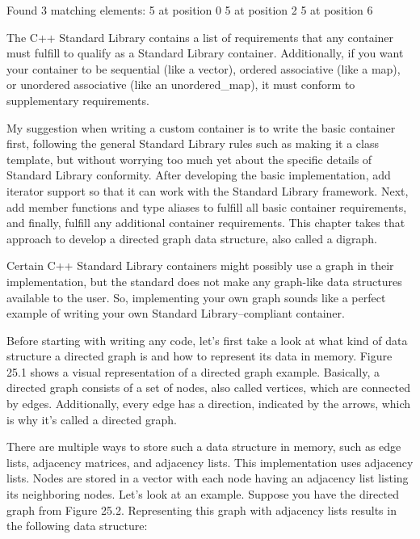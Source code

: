 \begin{shell}
Found 3 matching elements:
5 at position 0
5 at position 2
5 at position 6
\end{shell}


The C++ Standard Library contains a list of requirements that any container must fulfill to qualify as a Standard Library container. Additionally, if you want your container to be sequential (like a vector), ordered associative (like a map), or unordered associative (like an unordered\_map), it must conform to supplementary requirements.

My suggestion when writing a custom container is to write the basic container first, following the general Standard Library rules such as making it a class template, but without worrying too much yet about the specific details of Standard Library conformity. After developing the basic implementation, add iterator support so that it can work with the Standard Library framework. Next, add member functions and type aliases to fulfill all basic container requirements, and finally, fulfill any additional container requirements. This chapter takes that approach to develop a directed graph data structure, also called a digraph.




Certain C++ Standard Library containers might possibly use a graph in their implementation, but the standard does not make any graph-like data structures available to the user. So, implementing your own graph sounds like a perfect example of writing your own Standard Library–compliant container.

Before starting with writing any code, let’s first take a look at what kind of data structure a directed graph is and how to represent its data in memory. Figure 25.1 shows a visual representation of a directed graph example. Basically, a directed graph consists of a set of nodes, also called vertices, which are connected by edges. Additionally, every edge has a direction, indicated by the arrows, which is why it’s called a directed graph.


There are multiple ways to store such a data structure in memory, such as edge lists, adjacency matrices, and adjacency lists. This implementation uses adjacency lists. Nodes are stored in a vector with each node having an adjacency list listing its neighboring nodes. Let’s look at an example. Suppose you have the directed graph from Figure 25.2. Representing this graph with adjacency lists results in the following data structure:

